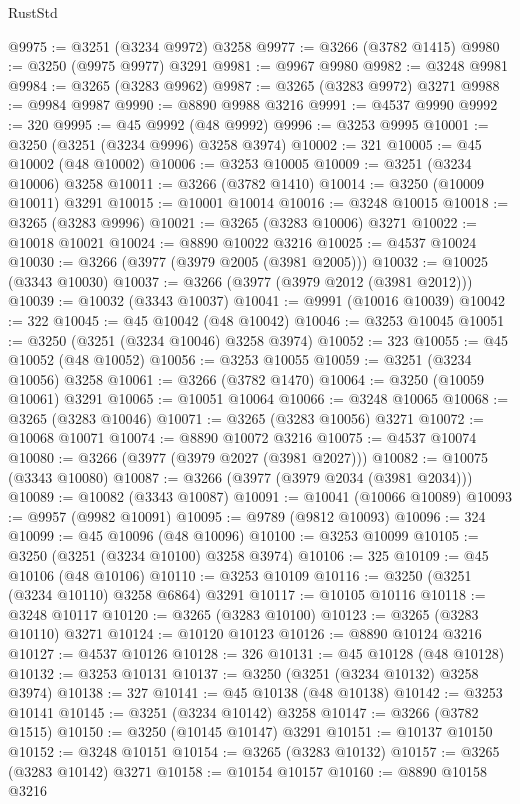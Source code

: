 \begin{lexlean}{RustStd}
\begin{coremodule}
@9975 := @3251 (@3234 @9972) @3258
@9977 := @3266 (@3782 @1415)
@9980 := @3250 (@9975 @9977) @3291
@9981 := @9967 @9980
@9982 := @3248 @9981
@9984 := @3265 (@3283 @9962)
@9987 := @3265 (@3283 @9972) @3271
@9988 := @9984 @9987
@9990 := @8890 @9988 @3216
@9991 := @4537 @9990
@9992 := 320
@9995 := @45 @9992 (@48 @9992)
@9996 := @3253 @9995
@10001 := @3250 (@3251 (@3234 @9996) @3258 @3974)
@10002 := 321
@10005 := @45 @10002 (@48 @10002)
@10006 := @3253 @10005
@10009 := @3251 (@3234 @10006) @3258
@10011 := @3266 (@3782 @1410)
@10014 := @3250 (@10009 @10011) @3291
@10015 := @10001 @10014
@10016 := @3248 @10015
@10018 := @3265 (@3283 @9996)
@10021 := @3265 (@3283 @10006) @3271
@10022 := @10018 @10021
@10024 := @8890 @10022 @3216
@10025 := @4537 @10024
@10030 := @3266 (@3977 (@3979 @2005 (@3981 @2005)))
@10032 := @10025 (@3343 @10030)
@10037 := @3266 (@3977 (@3979 @2012 (@3981 @2012)))
@10039 := @10032 (@3343 @10037)
@10041 := @9991 (@10016 @10039)
@10042 := 322
@10045 := @45 @10042 (@48 @10042)
@10046 := @3253 @10045
@10051 := @3250 (@3251 (@3234 @10046) @3258 @3974)
@10052 := 323
@10055 := @45 @10052 (@48 @10052)
@10056 := @3253 @10055
@10059 := @3251 (@3234 @10056) @3258
@10061 := @3266 (@3782 @1470)
@10064 := @3250 (@10059 @10061) @3291
@10065 := @10051 @10064
@10066 := @3248 @10065
@10068 := @3265 (@3283 @10046)
@10071 := @3265 (@3283 @10056) @3271
@10072 := @10068 @10071
@10074 := @8890 @10072 @3216
@10075 := @4537 @10074
@10080 := @3266 (@3977 (@3979 @2027 (@3981 @2027)))
@10082 := @10075 (@3343 @10080)
@10087 := @3266 (@3977 (@3979 @2034 (@3981 @2034)))
@10089 := @10082 (@3343 @10087)
@10091 := @10041 (@10066 @10089)
@10093 := @9957 (@9982 @10091)
@10095 := @9789 (@9812 @10093)
@10096 := 324
@10099 := @45 @10096 (@48 @10096)
@10100 := @3253 @10099
@10105 := @3250 (@3251 (@3234 @10100) @3258 @3974)
@10106 := 325
@10109 := @45 @10106 (@48 @10106)
@10110 := @3253 @10109
@10116 := @3250 (@3251 (@3234 @10110) @3258 @6864) @3291
@10117 := @10105 @10116
@10118 := @3248 @10117
@10120 := @3265 (@3283 @10100)
@10123 := @3265 (@3283 @10110) @3271
@10124 := @10120 @10123
@10126 := @8890 @10124 @3216
@10127 := @4537 @10126
@10128 := 326
@10131 := @45 @10128 (@48 @10128)
@10132 := @3253 @10131
@10137 := @3250 (@3251 (@3234 @10132) @3258 @3974)
@10138 := 327
@10141 := @45 @10138 (@48 @10138)
@10142 := @3253 @10141
@10145 := @3251 (@3234 @10142) @3258
@10147 := @3266 (@3782 @1515)
@10150 := @3250 (@10145 @10147) @3291
@10151 := @10137 @10150
@10152 := @3248 @10151
@10154 := @3265 (@3283 @10132)
@10157 := @3265 (@3283 @10142) @3271
@10158 := @10154 @10157
@10160 := @8890 @10158 @3216

\end{coremodule}
\end{lexlean}
